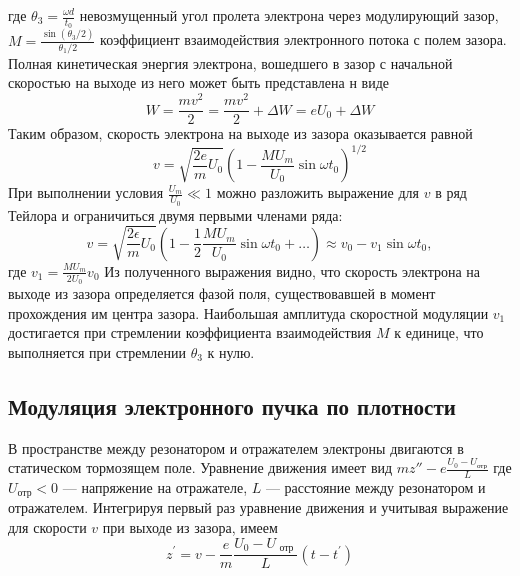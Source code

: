 где $\theta _ { 3 } = \frac { \omega d } { t _ { 0 } }$  невозмущенный угол пролета электрона через модулирующий зазор, 
$M = \frac { \sin \left( \theta _ { 3 } / 2 \right) } { \theta _ { 1 } / 2 }$ коэффициент взаимодействия электронного потока
с полем зазора. Полная кинетическая энергия электрона, вошедшего в зазор
с начальной скоростью на выходе из него может быть представлена н
виде
\begin{equation}
	W = \frac { m v ^ { 2 } } { 2 } = \frac { m v ^ { 2 } } { 2 } + \Delta W = e U _ { 0 } + \Delta W
\end{equation}
Таким образом, скорость электрона на выходе из зазора оказывается равной
\begin{equation}
	v = \sqrt { \frac { 2 e } { m } U _ { 0 } } \left( 1 - \frac { M U _ { m } } { U _ { 0 } } \sin \omega t _ { 0 } \right) ^ { 1 / 2 }
\end{equation}
При выполнении условия $\frac { U _ { m } } { U _ { 0 } } \ll 1$ можно разложить выражение для $v$ в ряд Тейлора и ограничиться двумя первыми членами ряда:
\begin{equation}
	v = \sqrt { \frac { 2 \epsilon } { m } U _ { 0 } } \left( 1 - \frac { 1 } { 2 } \frac { M U _ { m } } { U _ { 0 } } \sin \omega t _ { 0 } + \ldots \right) \approx v _ { 0 } - v _ { 1 } \sin \omega t _ { 0 },
\end{equation} где $v _ { 1 } = \frac { M U _ { m } } { 2 U _ { 0 } } v _ { 0 }$
Из полученного выражения видно, что скорость электро­на на выходе из зазора определяется фазой поля, существовавшей в момент
прохождения им центра зазора. Наибольшая амплитуда скоростной моду­ляции $v_1$ достигается при стремлении коэффициента взаимодействия $M$ к 
единице, что выполняется при стремлении $\theta_3$ к нулю.

\subsection{Модуляция электронного пучка по плотности}
В пространстве между резонатором и отражателем электроны двигаются в статическом тормозящем поле. Уравнение движения имеет вид 
$mz''- e \frac { U _ { 0 } - U _ { \text{отр} } } { L }$ где $U_{\text{отр}} < 0$ — напряжение на отражателе, $L$ — расстояние между резонатором и отражателем. Интегрируя первый раз уравнение дви­жения и учитывая выражение для скорости $v$ при выходе из зазора, имеем
\begin{equation}
	z ^ { \prime } = v - \frac { e } { m } \frac { U _ { 0 } - U _ { \text { отр } } } { L } \left( t - t ^ { \prime } \right)
\end{equation}


